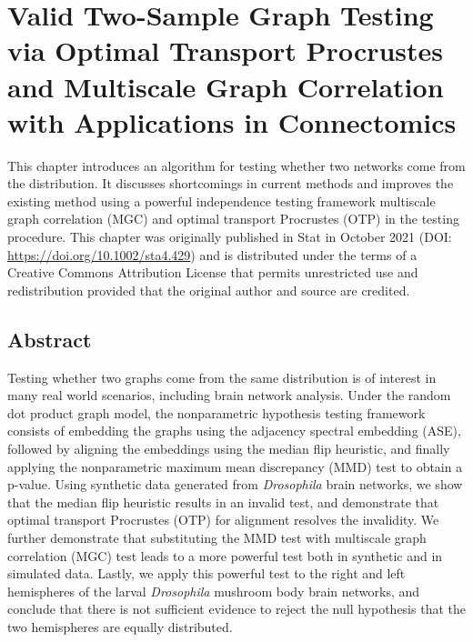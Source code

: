 \chapter[Two-Sample Graph Testing]{Valid Two-Sample Graph Testing via Optimal Transport Procrustes and Multiscale Graph Correlation with Applications in Connectomics} \label{chap:nonpar}

This chapter introduces an algorithm for testing whether two networks come from the distribution. It discusses shortcomings in current methods and improves the existing method using a powerful independence testing framework multiscale graph correlation (MGC) and optimal transport Procrustes (OTP) in the testing procedure. This chapter was originally published in Stat in October 2021 (DOI:  \url{https://doi.org/10.1002/sta4.429}) and is distributed under the terms of a Creative Commons Attribution License that permits unrestricted use and redistribution provided that the original author and source are credited.

\begin{singlespace}         %
     
\end{singlespace} 

\pagebreak
\section*{Abstract}
Testing whether two graphs come from the same distribution is of interest in many real world scenarios, including brain network analysis.
Under the random dot product graph model, the nonparametric hypothesis testing framework consists of embedding the graphs using the adjacency spectral embedding (ASE), followed by  aligning the embeddings using the median flip heuristic, and finally applying the nonparametric maximum mean discrepancy (MMD) test to obtain a p-value.
Using synthetic data generated from \textit{Drosophila} brain networks, we show that the median flip heuristic results in an invalid test, and demonstrate that optimal transport Procrustes (OTP) for alignment resolves the invalidity.
We further demonstrate that substituting the MMD test with multiscale graph correlation (MGC) test leads to a more powerful test both in synthetic and in simulated data.
Lastly, we apply this powerful test to the right and left hemispheres of the larval \textit{Drosophila} mushroom body brain networks, and conclude that there is not sufficient evidence to reject the null hypothesis that the two hemispheres are equally distributed.

